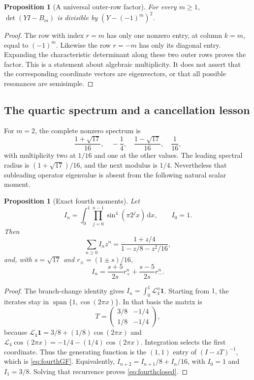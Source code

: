 \documentclass[11pt,a4paper]{article}
\newtheorem{proposition}[theorem]{Proposition}
\theoremstyle{definition}
\theoremstyle{remark}
\newcommand{\dd}{\,\mathrm d}
\newcommand{\one}{\mathbf 1}
\newcommand{\Lop}{\mathcal L}
\newcommand{\Span}{\operatorname{span}}
\numberwithin{equation}{section}
\begin{document}
\begin{proposition}[A universal outer-row factor]
\label{prop:outerfactor}
For every $m\ge1$, $\det(YI-B_m)$ is divisible by
$(Y-(-1)^m)^2$.
\end{proposition}
\begin{proof}
The row with index $r=m$ has only one nonzero entry, at column $k=m$,
equal to $(-1)^m$. Likewise the row $r=-m$ has only its diagonal entry.
Expanding the characteristic determinant along these two outer rows proves
the factor. This is a statement about algebraic multiplicity. It does not
assert that the corresponding coordinate vectors are eigenvectors, or that
all possible resonances are semisimple.
\end{proof}

\subsection{The quartic spectrum and a cancellation lesson}
For $m=2$, the complete nonzero spectrum is
\begin{equation}
 \frac{1+\sqrt{17}}{16},\quad -\frac14,\quad
 \frac{1-\sqrt{17}}{16},\quad \frac1{16},
 \label{eq:quarticspectrum}
\end{equation}
with multiplicity two at $1/16$ and one at the other values. The leading
spectral radius is $(1+\sqrt{17})/16$, and the next modulus is $1/4$.
Nevertheless that subleading operator eigenvalue is absent from the
following natural scalar moment.

\begin{proposition}[Exact fourth moments]
\label{prop:fourthmoment}
Let
\[
 I_n=\int_0^1\prod_{j=0}^{n-1}\sin^4(\pi2^jx)\dd x,
 \qquad I_0=1.
\]
Then
\begin{equation}
 \sum_{n\ge0}I_nz^n=\frac{1+z/4}{1-z/8-z^2/16},
 \label{eq:fourthGF}
\end{equation}
and, with $s=\sqrt{17}$ and $r_\pm=(1\pm s)/16$,
\begin{equation}
 I_n=\frac{s+5}{2s}r_+^n+\frac{s-5}{2s}r_-^n.
 \label{eq:fourthclosed}
\end{equation}
\end{proposition}
\begin{proof}
The branch-change identity gives $I_n=\int_0^1\Lop_4^n\one$.
Starting from $1$, the iterates stay in
$\Span\{1,\cos(2\pi x)\}$. In that basis the matrix is
\[
 T=\begin{pmatrix}3/8&-1/4\\1/8&-1/4\end{pmatrix},
\]
because $\Lop_4\one=3/8+(1/8)\cos(2\pi x)$ and
$\Lop_4\cos(2\pi x)=-1/4-(1/4)\cos(2\pi x)$.
Integration selects the first coordinate. Thus the generating function is
the $(1,1)$ entry of $(I-zT)^{-1}$, which is \cref{eq:fourthGF}.
Equivalently,
$I_{n+2}=I_{n+1}/8+I_n/16$, with $I_0=1$ and $I_1=3/8$.
Solving that recurrence proves \cref{eq:fourthclosed}.
\end{proof}
\end{document}
